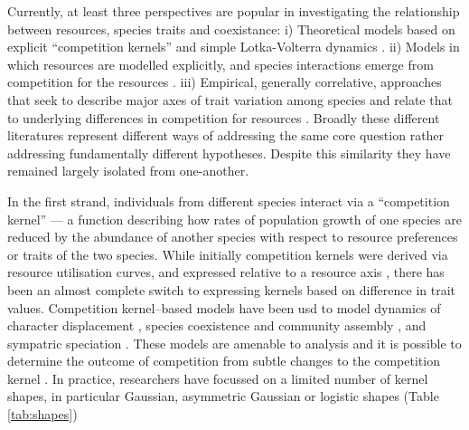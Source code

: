 \documentclass[a4paper,11pt]{article}
\begin{document}
Currently, at least three perspectives are popular in investigating
the relationship between resources, species traits and coexistance:
%
i) Theoretical models based on explicit ``competition kernels'' and
simple Lotka-Volterra dynamics
\citep[e.g.][]{MacArthur-1967,Case-1982,Dieckmann-1999,Leimar-2013}.
%
ii) Models in which resources are modelled explicitly, and species
interactions emerge from competition for the resources
\citep[e.g.][]{Tilman-1977, Huston-1987, Kohyama-1993, Falster-2011}.
%
iii) Empirical, generally correlative, approaches that seek to
describe major axes of trait variation among species and relate that
to underlying differences in competition for resources
\citep[e.g.][]{Grime-1979, Weiher-1999, Westoby-2002}.
Broadly these different literatures represent different ways of
addressing the same core question rather addressing fundamentally
different hypotheses.  Despite this similarity they have remained
largely isolated from one-another.

In the first strand, individuals from different species interact via a
``competition kernel'' --- a function describing how rates of
population growth of one species are reduced by the abundance of
another species with respect to resource preferences or traits of the
two species.
%
While initially competition kernels were derived via resource
utilisation curves, and expressed relative to a resource axis
\citep{MacArthur-1967, Roughgarden-1979}, there has been an almost
complete switch to expressing kernels based on difference in trait
values.
%
Competition kernel--based models have been usd to model dynamics of
character displacement \citep{Taper-1985, Case-2000}, species
coexistence and community assembly \citep{MacArthur-1967,
  Calcagno-2006, Leimar-2013}, and sympatric speciation
\citep{Dieckmann-1999}.
%
These models are amenable to analysis and it is possible to determine
the outcome of competition from subtle changes to the competition
kernel \citep{Calcagno-2006, Scheffer-2006, Pigolotti-2007,
  Leimar-2013}.
%
In practice, researchers have focussed on a limited number of kernel
shapes, in particular Gaussian, asymmetric Gaussian or logistic shapes
(Table \ref{tab:shapes})
\end{document}
